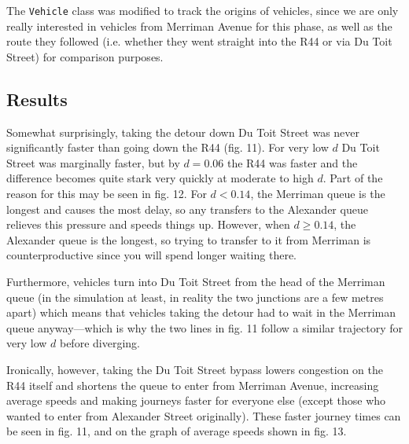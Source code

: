 \documentclass{article}
\begin{document}
The \texttt{Vehicle} class was modified to track the origins of vehicles, since we are only really interested in vehicles from Merriman Avenue for this phase, as well as the route they followed (i.e. whether they went straight into the R44 or via Du Toit Street) for comparison purposes.

\subsection*{Results}

Somewhat surprisingly, taking the detour down Du Toit Street was never significantly faster than going down the R44 (fig. 11). For very low $d$ Du Toit Street was marginally faster, but by $d = 0.06$ the R44 was faster and the difference becomes quite stark very quickly at moderate to high $d$. Part of the reason for this may be seen in fig. 12. For $d < 0.14$, the Merriman queue is the longest and causes the most delay, so any transfers to the Alexander queue relieves this pressure and speeds things up. However, when $d \geq 0.14$, the Alexander queue is the longest, so trying to transfer to it from Merriman is counterproductive since you will spend longer waiting there.

Furthermore, vehicles turn into Du Toit Street from the head of the Merriman queue (in the simulation at least, in reality the two junctions are a few metres apart) which means that vehicles taking the detour had to wait in the Merriman queue anyway---which is why the two lines in fig. 11 follow a similar trajectory for very low $d$ before diverging.

Ironically, however, taking the Du Toit Street bypass lowers congestion on the R44 itself and shortens the queue to enter from Merriman Avenue, increasing average speeds and making journeys faster for everyone else (except those who wanted to enter from Alexander Street originally). These faster journey times can be seen in fig. 11, and on the graph of average speeds shown in fig. 13.
\end{document}
